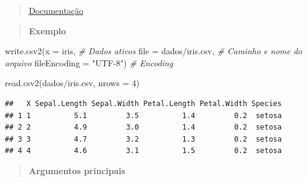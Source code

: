 \documentclass[
]{book}
\newenvironment{Shaded}{\begin{snugshade}}{\end{snugshade}}
\newcommand{\AttributeTok}[1]{\textcolor[rgb]{0.77,0.63,0.00}{#1}}
\newcommand{\CommentTok}[1]{\textcolor[rgb]{0.56,0.35,0.01}{\textit{#1}}}
\newcommand{\DecValTok}[1]{\textcolor[rgb]{0.00,0.00,0.81}{#1}}
\newcommand{\FunctionTok}[1]{\textcolor[rgb]{0.00,0.00,0.00}{#1}}
\newcommand{\NormalTok}[1]{#1}
\newcommand{\StringTok}[1]{\textcolor[rgb]{0.31,0.60,0.02}{#1}}
\theoremstyle{definition}
\theoremstyle{definition}
\theoremstyle{definition}
\theoremstyle{definition}
\theoremstyle{remark}
\begin{document}
\begin{quote}
\href{https://www.rdocumentation.org/packages/utils/versions/3.6.2/topics/write.table}{Documentação}
\end{quote}

\begin{quote}
\textbf{Exemplo}
\end{quote}

\begin{Shaded}
\begin{Highlighting}[]
\FunctionTok{write.csv2}\NormalTok{(}\AttributeTok{x =}\NormalTok{ iris,                }\CommentTok{\# Dados ativos}
           \AttributeTok{file =} \StringTok{\textquotesingle{}dados/iris.csv\textquotesingle{}}\NormalTok{, }\CommentTok{\# Caminho e nome do arquivo}
           \AttributeTok{fileEncoding =} \StringTok{"UTF{-}8"}\NormalTok{)  }\CommentTok{\# Encoding}

\FunctionTok{read.csv2}\NormalTok{(}\StringTok{\textquotesingle{}dados/iris.csv\textquotesingle{}}\NormalTok{, }\AttributeTok{nrows =} \DecValTok{4}\NormalTok{)}
\end{Highlighting}
\end{Shaded}

\begin{verbatim}
##   X Sepal.Length Sepal.Width Petal.Length Petal.Width Species
## 1 1          5.1         3.5          1.4         0.2  setosa
## 2 2          4.9         3.0          1.4         0.2  setosa
## 3 3          4.7         3.2          1.3         0.2  setosa
## 4 4          4.6         3.1          1.5         0.2  setosa
\end{verbatim}

\begin{quote}
\textbf{Argumentos principais}
\end{quote}
\end{document}
